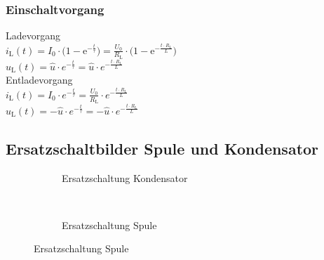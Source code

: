 \subsubsection{Einschaltvorgang}
\begin{multicols}{2}
	Ladevorgang\\
	$i_{\mathrm{L}} (t) = I_0 \cdot \biggl(1 - \mathrm{e}^{-
	\frac{t}{\tau}}\biggr) = \frac{U_0}{R_{\mathrm{L}}} \cdot \biggl(1 -
	\mathrm{e}^{- \frac{t \cdot R_{\mathrm{L}}}{L}}\biggr)$\\
	$u_{\mathrm{L}} (t) = \hat u \cdot e^{- \frac{t}{\tau}} = \hat u \cdot e^{-
	\frac{t \cdot R_{\mathrm{L}}}{L}}$\\
	\newline
	Entladevorgang\\
	$i_{\mathrm{L}} (t) = I_0 \cdot e^{- \frac{t}{\tau}} =
	\frac{U_0}{R_{\mathrm{L}}} \cdot e^{- \frac{t \cdot
	R_{\mathrm{L}}}{L}}$\\
	$u_{\mathrm{L}} (t) = - \hat u \cdot e^{- \frac{t}{\tau}} = - \hat u \cdot
	e^{- \frac{t \cdot R_{\mathrm{L}}}{L}}$\\
\end{multicols}

\subsection{Ersatzschaltbilder Spule und Kondensator}
\begin{figure}[h!]
        \centering
        \begin{subfigure}[b]{0.4\textwidth}
                \centering
                
                \caption{Ersatzschaltung Kondensator}
        \end{subfigure}%
        ~ %
        \begin{subfigure}[b]{0.4\textwidth}
                \centering
                
                \caption{Ersatzschaltung Spule}
        \end{subfigure}
\end{figure}

